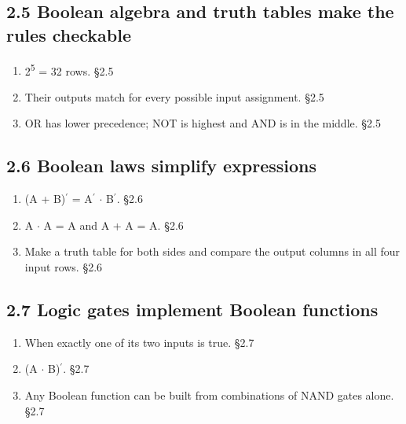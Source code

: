 \documentclass[11pt]{article}
\begin{document}
\begin{keepsection}\subsection{2.5 Boolean algebra and truth tables make the rules checkable}

\begin{enumerate}
\item 2\textsuperscript{5} = 32 rows. \hfill{\small\color{FAUblue}§2.5}
\item Their outputs match for every possible input assignment. \hfill{\small\color{FAUblue}§2.5}
\item OR has lower precedence; NOT is highest and AND is in the middle. \hfill{\small\color{FAUblue}§2.5}
\end{enumerate}

\end{keepsection}
\begin{keepsection}\subsection{2.6 Boolean laws simplify expressions}

\begin{enumerate}
\item (A + B)\ensuremath{{}^{\prime}} = A\ensuremath{{}^{\prime}} \ensuremath{\cdot} B\ensuremath{{}^{\prime}}. \hfill{\small\color{FAUblue}§2.6}
\item A \ensuremath{\cdot} A = A and A + A = A. \hfill{\small\color{FAUblue}§2.6}
\item Make a truth table for both sides and compare the output columns in all four input rows. \hfill{\small\color{FAUblue}§2.6}
\end{enumerate}

\end{keepsection}
\begin{keepsection}\subsection{2.7 Logic gates implement Boolean functions}

\begin{enumerate}
\item When exactly one of its two inputs is true. \hfill{\small\color{FAUblue}§2.7}
\item (A \ensuremath{\cdot} B)\ensuremath{{}^{\prime}}. \hfill{\small\color{FAUblue}§2.7}
\item Any Boolean function can be built from combinations of NAND gates alone. \hfill{\small\color{FAUblue}§2.7}
\end{enumerate}

\end{keepsection}
\end{document}
